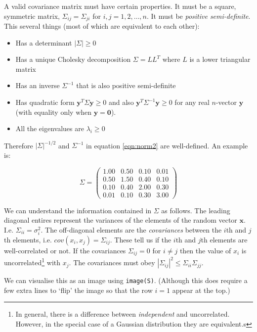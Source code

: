 \documentclass[a4paper,11pt]{article}\usepackage[]{graphicx}\usepackage[]{color}
\begin{document}
A valid covariance matrix must have certain properties. It must be a square, symmetric matrix, $\Sigma_{ij} = \Sigma_{ji}$ for $i,j = 1, 2, \ldots, n$. It must be \emph{positive semi-definite}. This several things (most of which are equivalent to each other):
\begin{itemize}
\item Has a determinant $|\Sigma| \ge 0$
\item Has a unique Cholesky decomposition $\Sigma = LL^T$ where $L$ is a lower triangular matrix
\item Has an inverse $\Sigma^{-1}$ that is also positive semi-definite
\item Has quadratic form $\mathbf{y}^T \Sigma \mathbf{y} \ge 0$ and also $\mathbf{y}^T \Sigma^{-1} \mathbf{y} \ge 0$ for any real $n$-vector $\mathbf{y}$ (with equality only when $\mathbf{y} = \mathbf{0}$).
\item All the eigenvalues are $\lambda_i \ge 0$
\end{itemize}
Therefore $|\Sigma|^{-1/2}$ and $\Sigma^{-1}$ in equation \ref{eqn:norm2} are well-defined. An example is:

\begin{equation}
 \Sigma = \begin{pmatrix}
 1.00 & 0.50 & 0.10 & 0.01 \\
 0.50 & 1.50 & 0.40 & 0.10 \\
 0.10 & 0.40 & 2.00 & 0.30 \\
 0.01 & 0.10 & 0.30 & 3.00 
 \end{pmatrix}
\end{equation}

We can understand the information contained in $\Sigma$ as follows. The leading diagonal entires represent the variances of the elements of the random vector $\mathbf{x}$. I.e. $\Sigma_{ii} = \sigma_{i}^2$. The off-diagonal elements are the \emph{covariances} between the $i$th and $j$th elements, i.e. $cov(x_i, x_j) = \Sigma_{ij}$. These tell us if the $i$th and $j$th elements are well-correlated or not. If the covariances $\Sigma_{ij} = 0$ for $i \ne j$ then the value of $x_i$ is uncorrelated\footnote{In general, there is a difference between \emph{independent} and {uncorrelated}. However, in the special case of a Gaussian distribution they are equivalent.s} with $x_j$. The covariances must obey $|\Sigma_{ij}|^2 \le \Sigma_{ii} \Sigma_{jj}$. 

We can visualise this as an image using {\tt image(S)}. (Although this does require a few extra lines to `flip' the image so that the row $i=1$ appear at the top.)
\end{document}
